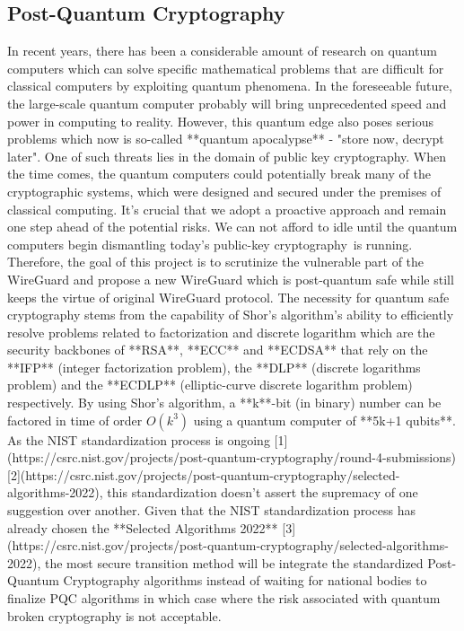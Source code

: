 \subsection{Post-Quantum Cryptography}
In recent years, there has been a considerable amount of research on quantum computers which can solve specific mathematical problems that are difficult for classical computers by exploiting quantum phenomena. In the foreseeable future, the large-scale quantum computer probably will bring unprecedented speed and power in computing to reality. However, this quantum edge also poses serious problems which now is so-called **quantum apocalypse** - "store now, decrypt later". One of such threats lies in the domain of public key cryptography. When the time comes, the quantum computers could potentially break many of the cryptographic systems, which were designed and secured under the premises of classical computing. It's crucial that we adopt a proactive approach and remain one step ahead of the potential risks. We can not afford to idle until the quantum computers begin dismantling today’s public-key cryptography is running. Therefore, the goal of this project is to scrutinize the vulnerable part of the WireGuard and propose a new WireGuard which is post-quantum safe while still keeps the virtue of original WireGuard protocol. 
The necessity for quantum safe cryptography stems from the capability of Shor's algorithm's ability to efficiently resolve problems related to factorization and discrete logarithm which are the security backbones of **RSA**, **ECC** and **ECDSA** that rely on the **IFP** (integer factorization problem), the **DLP** (discrete logarithms problem) and the **ECDLP** (elliptic-curve discrete logarithm problem) respectively. By using Shor's algorithm, a **k**-bit (in binary) number can be factored in time of order $O(k^3)$ using a quantum computer of **5k+1 qubits**. As the NIST standardization process is ongoing [1](https://csrc.nist.gov/projects/post-quantum-cryptography/round-4-submissions)[2](https://csrc.nist.gov/projects/post-quantum-cryptography/selected-algorithms-2022), this standardization doesn't assert the supremacy of one suggestion over another. Given that the NIST standardization process has already chosen the **Selected Algorithms 2022** [3](https://csrc.nist.gov/projects/post-quantum-cryptography/selected-algorithms-2022), the most secure transition method will be integrate the standardized Post-Quantum Cryptography algorithms instead of waiting for national bodies to finalize PQC algorithms in which case where the risk associated with quantum broken cryptography is not acceptable.


